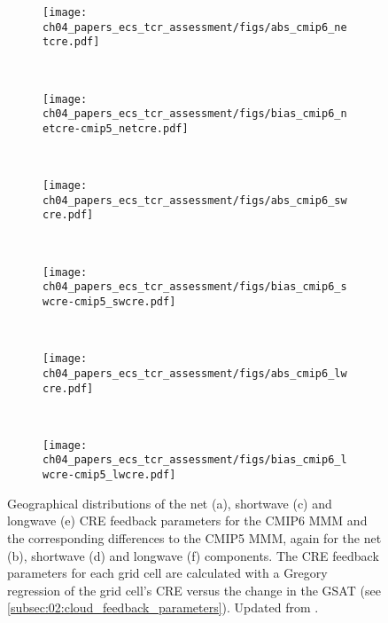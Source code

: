 \begin{figure}[p]
  \centering
  \begin{subfigure}[t]{\SmallSubfigureWidth{}}
    \texttt{[image: 
      ch04\_papers\_ecs\_tcr\_assessment/figs/abs\_cmip6\_netcre.pdf]}
    \caption{}
    \label{fig:04:cloud_feedback_parameters:a}
  \end{subfigure}
  ~
  \begin{subfigure}[t]{\SmallSubfigureWidth{}}
    \texttt{[image: 
      ch04\_papers\_ecs\_tcr\_assessment/figs/bias\_cmip6\_netcre-cmip5\_netcre.pdf]}
    \caption{}
    \label{fig:04:cloud_feedback_parameters:b}
  \end{subfigure}
  \\
  \begin{subfigure}[t]{\SmallSubfigureWidth{}}
    \texttt{[image: 
      ch04\_papers\_ecs\_tcr\_assessment/figs/abs\_cmip6\_swcre.pdf]}
    \caption{}
    \label{fig:04:cloud_feedback_parameters:c}
  \end{subfigure}
  ~
  \begin{subfigure}[t]{\SmallSubfigureWidth{}}
    \texttt{[image: 
      ch04\_papers\_ecs\_tcr\_assessment/figs/bias\_cmip6\_swcre-cmip5\_swcre.pdf]}
    \caption{}
    \label{fig:04:cloud_feedback_parameters:d}
  \end{subfigure}
  \\
  \begin{subfigure}[t]{\SmallSubfigureWidth{}}
    \texttt{[image: 
      ch04\_papers\_ecs\_tcr\_assessment/figs/abs\_cmip6\_lwcre.pdf]}
    \caption{}
    \label{fig:04:cloud_feedback_parameters:e}
  \end{subfigure}
  ~
  \begin{subfigure}[t]{\SmallSubfigureWidth{}}
    \texttt{[image: 
      ch04\_papers\_ecs\_tcr\_assessment/figs/bias\_cmip6\_lwcre-cmip5\_lwcre.pdf]}
    \caption{}
    \label{fig:04:cloud_feedback_parameters:f}
  \end{subfigure}
  \caption{Geographical distributions of the net (a), shortwave (c) and
    longwave (e) \acf{CRE} feedback parameters for the \acs{CMIP}6 \acf{MMM}
    and the corresponding differences to the \acs{CMIP}5 \acs{MMM}, again for
    the net (b), shortwave (d) and longwave (f) components. The \acs{CRE}
    feedback parameters for each grid cell are calculated with a Gregory
    regression of the grid cell's \acs{CRE} versus the change in the
    \acl{GSAT} (see \cref{subsec:02:cloud_feedback_parameters}). Updated from
    \textcite{Bock2020}.}
  \label{fig:04:cloud_feedback_parameters}
\end{figure}

